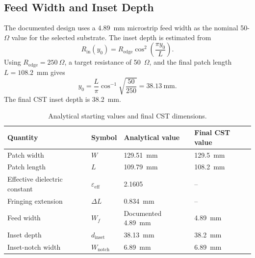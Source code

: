 \subsection{Feed Width and Inset Depth}

The documented design uses a 4.89~mm microstrip feed width as the nominal
50-$\Omega$ value for the selected substrate. The inset depth is estimated from
\begin{equation}
R_{\mathrm{in}}(y_0)=R_{\mathrm{edge}}
\cos^2\left(\frac{\pi y_0}{L}\right).
\label{eq:inset-resistance}
\end{equation}
Using $R_{\mathrm{edge}}=250~\Omega$, a target resistance of 50~$\Omega$, and the
final patch length $L=108.2$~mm gives
\begin{equation}
y_0=\frac{L}{\pi}\cos^{-1}\sqrt{\frac{50}{250}}
=38.13~\text{mm}.
\label{eq:inset-depth}
\end{equation}
The final CST inset depth is 38.2~mm.

\begin{table}[H]
\centering
\caption{Analytical starting values and final CST dimensions.}
\label{tab:analytical-final-dimensions}
\begin{tabular}{@{}llll@{}}
\toprule
\textbf{Quantity} & \textbf{Symbol} & \textbf{Analytical value} & \textbf{Final CST value} \\
\midrule
Patch width & $W$ & 129.51~mm & 129.5~mm \\
Patch length & $L$ & 109.79~mm & 108.2~mm \\
Effective dielectric constant & $\varepsilon_{\mathrm{eff}}$ & 2.1605 & -- \\
Fringing extension & $\Delta L$ & 0.834~mm & -- \\
Feed width & $W_f$ & Documented 4.89~mm & 4.89~mm \\
Inset depth & $d_{\mathrm{inset}}$ & 38.13~mm & 38.2~mm \\
Inset-notch width & $W_{\mathrm{notch}}$ & 6.89~mm & 6.89~mm \\
\bottomrule
\end{tabular}
\end{table}
